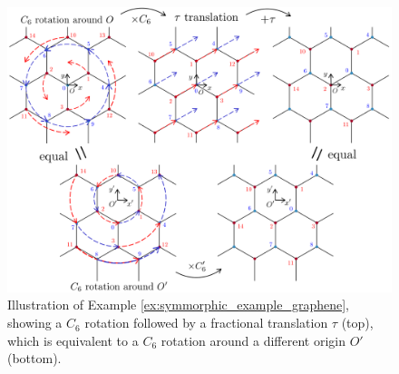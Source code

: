\begin{figure}[H]
\centering
\includegraphics[width=\linewidth]{fig/space_group_example_honeycomb.png}
\caption{Illustration of Example \ref{ex:symmorphic_example_graphene}, showing a \(C_6\) rotation followed by a fractional translation \(\tau\) (top), which is equivalent to a \(C_6\) rotation around a different origin \(O'\) (bottom).}
\label{fig:space_group_example_honeycomb}
\end{figure}




